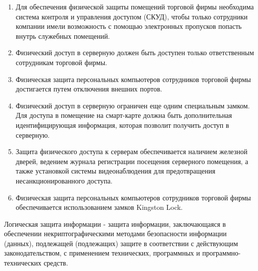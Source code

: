 \begin{enumerate}
	\item Для обеспечения физической защиты помещений торговой фирмы необходима система контроля и управления доступом (СКУД), чтобы только сотрудники компании имели возможность с помощью электронных пропусков попасть внутрь служебных помещений. 
	\item Физический доступ в серверную должен быть доступен только ответственным сотрудникам торговой фирмы.
	\item Физическая защита персональных компьютеров сотрудников торговой фирмы достигается путем отключения внешних портов.
	\item Физический доступ в серверную ограничен еще одним специальным замком. Для доступа в помещение на смарт-карте должна быть дополнительная идентифицирующая информация, которая позволит получить доступ в серверную.
	\item Защита физического доступа к серверам обеспечивается наличием железной дверей, ведением журнала регистрации посещения серверного помещения, а также установкой системы видеонаблюдения для предотвращения несанкционированного доступа.
	\item Физическая защита персональных компьютеров сотрудников торговой фирмы обеспечивается использованием замков Kingston Lock.
\end{enumerate}

Логическая защита информации\cite{GOST50922} - защита информации, заключающаяся в обеспечении некриптографическими методами безопасности информации (данных), подлежащей (подлежащих) защите в соответствии с действующим законодательством, с применением технических, программных и программно-технических средств. 

